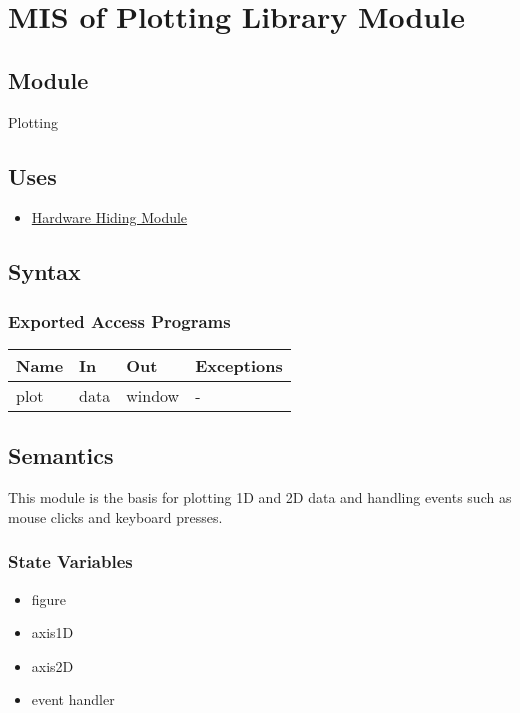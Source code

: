 \documentclass[12pt, titlepage]{article}
\begin{document}
\section{MIS of Plotting Library Module} \label{Mod:Plotting}

\subsection{Module}

Plotting

\subsection{Uses}
\begin{itemize}
    \item \hyperref[Mod:HH]{Hardware Hiding Module}
\end{itemize}

\subsection{Syntax}

\subsubsection{Exported Access Programs}

\begin{center}
    \begin{tabular}{p{2cm} p{4cm} p{4cm} p{2cm}}
        \hline
        \textbf{Name} & \textbf{In} & \textbf{Out} & \textbf{Exceptions} \\
        \hline
        plot & data & window & - \\
        \hline
    \end{tabular}
\end{center}

\subsection{Semantics}
This module is the basis for plotting 1D and 2D data and handling events such as
mouse clicks and keyboard presses.

\subsubsection{State Variables}
\begin{itemize}
    \item figure
    \item axis1D
    \item axis2D
    \item event handler
\end{itemize}
\end{document}
